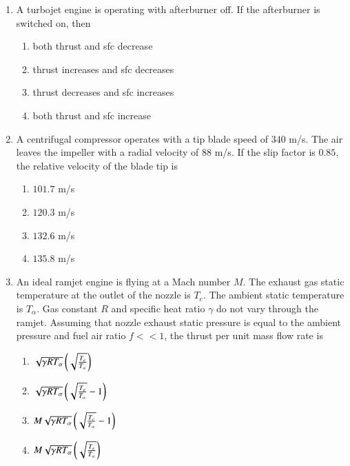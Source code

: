 \documentclass[journal,onecolumn]{IEEEtran}
\theoremstyle{remark}
\begin{document}
\begin{enumerate}
    \item A turbojet engine is operating with afterburner off. If the afterburner is switched on, then
	\hfill{}

	\begin{enumerate}
		\item both thrust and sfc decrease
		\item thrust increases and sfc decreases
		\item thrust decreases and sfc increases
		\item both thrust and sfc increase 
	\end{enumerate}

    \item A centrifugal compressor operates with a tip blade speed of $340$ m/s. The air leaves the impeller with a radial velocity of $88$ m/s. If the slip factor is $0.85$, the relative velocity of the blade tip is
	\hfill{}

	\begin{enumerate}
		\item $101.7$ m/s
		\item $120.3$ m/s
		\item $132.6$ m/s
		\item $135.8$ m/s
	\end{enumerate}

    \item An ideal ramjet engine is flying at a Mach number $M$. The exhaust gas static temperature at the outlet of the nozzle is $T_e$. The ambient static temperature is $T_{\alpha}$. Gas constant $R$ and specific heat ratio $\gamma$ do not vary through the ramjet. Assuming that nozzle exhaust static pressure is equal to the ambient pressure and fuel air ratio $f << 1$, the thrust per unit mass flow rate is
	\hfill{}

	\begin{enumerate}
		\item $\sqrt{\gamma R T_{\alpha}}\left(\sqrt{\frac{T_e}{T_{\alpha}}}\right)$
		\item $\sqrt{\gamma R T_{\alpha}}\left(\sqrt{\frac{T_e}{T_{\alpha}}} - 1\right)$
		\item $M\sqrt{\gamma R T_{\alpha}}\left(\sqrt{\frac{T_e}{T_{\alpha}}} - 1\right)$
		\item $M\sqrt{\gamma R T_{\alpha}}\left(\sqrt{\frac{T_e}{T_{\alpha}}}\right)$
	\end{enumerate}



\end{enumerate}
\end{document}
